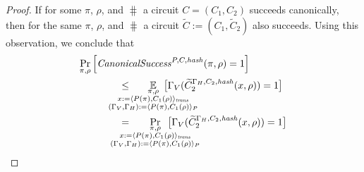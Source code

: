 %
\begin{proof}
If for some $\pi$, $\rho$, and $\hash$ a circuit $C = (C_1, C_2)$ succeeds canonically,
then for the same $\pi$, $\rho$, and $\hash$ a circuit $\widetilde{C} := (C_1, \widetilde{C}_2)$ also succeeds.
Using this observation, we conclude that
\begin{align*}
  &\underset{\pi, \rho}{\Pr}\left[\CanonicalSuccess^{P, C, \hash}(\pi, \rho) = 1\right] \\
  &\IndII \leq
  \mkern33mu
    \underset{
      \mathclap{
        \substack{\pi, \rho \\
        x := \langle P(\pi), C_1(\rho) \rangle_{\mathit{trans}} \\
        (\Gamma_V, \Gamma_H) := \langle P(\pi), C_1(\rho) \rangle_{P}
      }}}
    {\mathbb{E}}\mkern13mu\big[\Gamma_V(\widetilde{C}_2^{\Gamma_H, C_2, \hash}(x, \rho)) = 1\big] \\
  &\IndII =
  \mkern33mu
    \underset{
      \mathclap{
        \substack{\pi, \rho \\
        x := \langle P(\pi), C_1(\rho) \rangle_{\mathit{trans}} \\
        (\Gamma_V, \Gamma_H) := \langle P(\pi), C_1(\rho) \rangle_{P}
      }}}
    {\Pr}\mkern13mu\big[\Gamma_V(\widetilde{C}_2^{\Gamma_H, C_2, \hash}(x, \rho)) = 1\big]
\end{align*}
\end{proof}
%
%
